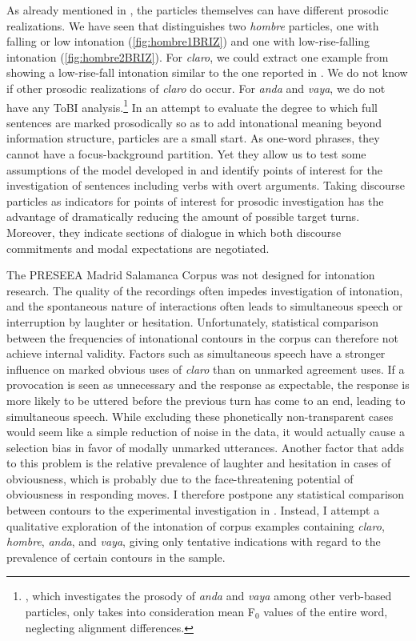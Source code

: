 As already mentioned in , the particles themselves can have different prosodic realizations. We have seen that \citet{Briz.2012} distinguishes two \textit{hombre} particles, one with falling or low intonation (\autoref{fig:hombre1BRIZ}) and one with low-rise-falling intonation (\autoref{fig:hombre2BRIZ}). For \textit{claro}, we could extract one example from \citet{PonsBorderia.2011} showing a low-rise-fall intonation similar to the one reported in \citet{TorreiraGrice.2018}. We do not know if other prosodic realizations of \textit{claro} do occur. For \textit{anda} and \textit{vaya}, we do not have any ToBI analysis.\footnote{\citet{Tanghe.2015}, which investigates the prosody of \textit{anda} and \textit{vaya} among other verb-based particles, only takes into consideration mean F$_0$ values of the entire word, neglecting alignment differences.} In an attempt to evaluate the degree to which full sentences are marked prosodically so as to add intonational meaning beyond information structure, particles are a small start. As one-word phrases, they cannot have a focus-background partition. Yet they allow us to test some assumptions of the model developed in  and identify points of interest for the investigation of sentences including verbs with overt arguments. Taking discourse particles as indicators for points of interest for pro\-so\-dic investigation has the advantage of dramatically reducing the amount of possible target turns. Moreover, they indicate sections of dialogue in which both discourse commitments and modal expectations are negotiated. 

The PRESEEA Madrid Salamanca Corpus was not designed for intonation research. The quality of the recordings often impedes investigation of intonation, and the spontaneous nature of interactions often leads to simultaneous speech or interruption by laughter or hesitation. Unfortunately, statistical comparison between the frequencies of intonational contours in the corpus can therefore not achieve internal validity. Factors such as simultaneous speech have a stronger influence on marked obvious uses of \textit{claro} than on unmarked agreement uses. If a provocation is seen as unnecessary and the response as expectable, the response is more likely to be uttered before the previous turn has come to an end, leading to simultaneous speech. While excluding these phonetically non-transparent cases would seem like a simple reduction of noise in the data, it would actually cause a selection bias in favor of modally unmarked utterances. Another factor that adds to this problem is the relative prevalence of laughter and hesitation in cases of obviousness, which is probably due to the face-threatening potential of obviousness in responding moves. I therefore postpone any statistical comparison between contours to the experimental investigation in . Instead, I attempt a qualitative exploration of the intonation of corpus examples containing \textit{claro}, \textit{hombre}, \textit{anda}, and \textit{vaya}, giving only tentative indications with regard to the prevalence of certain contours in the sample.

